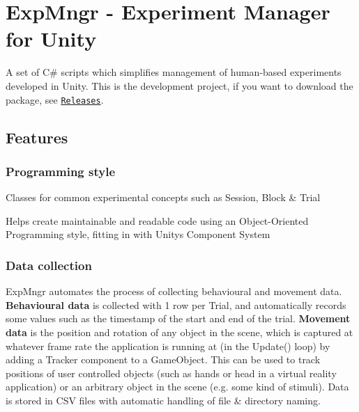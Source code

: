 

\section*{Exp\+Mngr -\/ Experiment Manager for Unity}

A set of C\# scripts which simplifies management of human-\/based experiments developed in Unity. This is the development project, if you want to download the package, see \href{https://github.com/jackbrookes/unity-experiment-manager/releases}{\tt Releases}.

\subsection*{Features}

\subsubsection*{Programming style}


\begin{DoxyItemize}
\item Classes for common experimental concepts such as {\ttfamily Session}, {\ttfamily Block} \& {\ttfamily Trial}
\item Helps create maintainable and readable code using an Object-\/\+Oriented Programming style, fitting in with Unity\textquotesingle{}s Component System
\end{DoxyItemize}

\subsubsection*{Data collection}

Exp\+Mngr automates the process of collecting behavioural and movement data. {\bfseries Behavioural data} is collected with 1 row per {\ttfamily Trial}, and automatically records some values such as the timestamp of the start and end of the trial. {\bfseries Movement data} is the position and rotation of any object in the scene, which is captured at whatever frame rate the application is running at (in the {\ttfamily Update()} loop) by adding a {\ttfamily Tracker} component to a Game\+Object. This can be used to track positions of user controlled objects (such as hands or head in a virtual reality application) or an arbitrary object in the scene (e.\+g. some kind of stimuli). Data is stored in C\+SV files with automatic handling of file \& directory naming.

